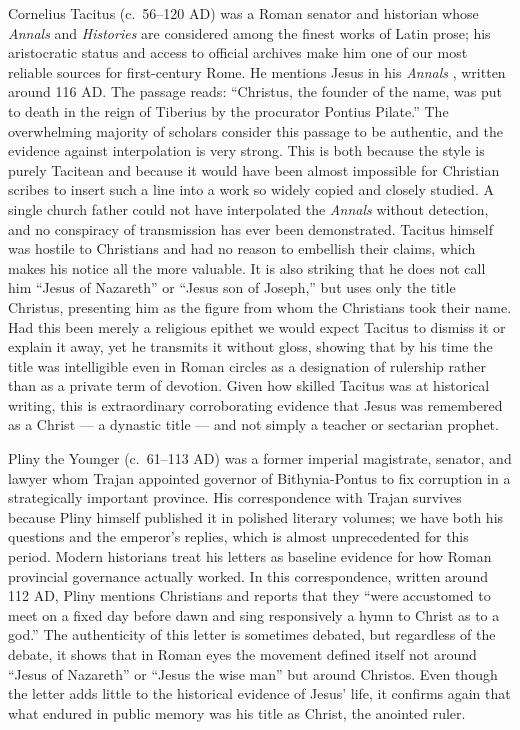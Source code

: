 Cornelius Tacitus (c.~56--120 AD) was a Roman senator and historian whose \emph{Annals} \cite{tacitus:annals} and \emph{Histories} \cite{tacitus:histories} are considered among the finest works of Latin prose; his aristocratic status and access to official archives make him one of our most reliable sources for first-century Rome.
He mentions Jesus in his \emph{Annals} \cite[15.44]{tacitus:annals}, written around 116 AD.
The passage reads: “Christus, the founder of the name, was put to death in the reign of Tiberius by the procurator Pontius Pilate.”
The overwhelming majority of scholars consider this passage to be authentic, and the evidence against interpolation is very strong.
This is both because the style is purely Tacitean and because it would have been almost impossible for Christian scribes to insert such a line into a work so widely copied and closely studied.
A single church father could not have interpolated the \emph{Annals} without detection, and no conspiracy of transmission has ever been demonstrated.
Tacitus himself was hostile to Christians and had no reason to embellish their claims, which makes his notice all the more valuable.
It is also striking that he does not call him “Jesus of Nazareth” or “Jesus son of Joseph,” but uses only the title Christus, presenting him as the figure from whom the Christians took their name.
Had this been merely a religious epithet we would expect Tacitus to dismiss it or explain it away, yet he transmits it without gloss, showing that by his time the title was intelligible even in Roman circles as a designation of rulership rather than as a private term of devotion.
Given how skilled Tacitus was at historical writing, this is extraordinary corroborating evidence that Jesus was remembered as a Christ --- a dynastic title --- and not simply a teacher or sectarian prophet.

Pliny the Younger (c.~61--113 AD) was a former imperial magistrate, senator, and lawyer whom Trajan appointed governor of Bithynia-Pontus to fix corruption in a strategically important province.
His correspondence with Trajan survives because Pliny himself published it in polished literary volumes; we have both his questions and the emperor's replies, which is almost unprecedented for this period.
Modern historians treat his letters as baseline evidence for how Roman provincial governance actually worked.
In this correspondence, written around 112 AD, Pliny mentions Christians and reports that they ``were accustomed to meet on a fixed day before dawn and sing responsively a hymn to Christ as to a god.''
The authenticity of this letter is sometimes debated, but regardless of the debate, it shows that in Roman eyes the movement defined itself not around “Jesus of Nazareth” or “Jesus the wise man” but around Christos.
Even though the letter adds little to the historical evidence of Jesus’ life, it confirms again that what endured in public memory was his title as Christ, the anointed ruler.

